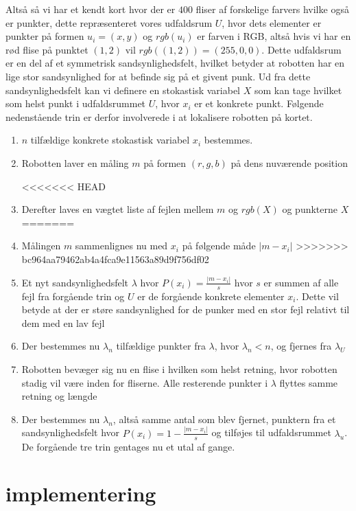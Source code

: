 \documentclass[../../SRP.tex]{subfiles}
\begin{document}

\begin{center}
\end{center}

Altså så vi har et kendt kort hvor der er $400$ fliser af forskelige farvers hvilke også er punkter, dette repræsenteret vores udfaldsrum $U$, hvor dets elementer er punkter på formen $u_i = (x,y)$ og $rgb(u_i)$ er farven i RGB, altså hvis vi har en rød flise på punktet $(1,2)$ vil $rgb((1,2)) = (255,0,0)$. Dette udfaldsrum er en del af et symmetrisk sandsynlighedsfelt, hvilket betyder at robotten har en lige stor sandsynlighed for at befinde sig på et givent punk. Ud fra dette sandsynlighedsfelt kan vi definere en stokastisk variabel $X$ som kan tage hvilket som helst punkt i udfaldsrummet $U$, hvor $x_i$ er et konkrete punkt. Følgende nedenstående trin er derfor involverede i at lokalisere robotten på kortet.

\begin{enumerate}
  \item $n$ tilfældige konkrete stokastisk variabel $x_i$ bestemmes.

  \item Robotten laver en måling $m$ på formen $(r,g,b)$ på dens nuværende position

<<<<<<< HEAD
  \item Derefter laves en vægtet liste af fejlen mellem $m$ og $rgb(X)$ og punkterne $X$
=======
  \item Målingen $m$ sammenlignes nu med $x_i$ på følgende måde $|m - x_i|$
>>>>>>> bc964aa79462ab4a4fca9e11563a89d9f756df02

  \item Et nyt sandsynlighedsfelt $\lambda$ hvor $P(x_i) = \frac{|m - x_i|}{s}$ hvor $s$ er summen af alle fejl fra forgående trin og $U$ er de forgående konkrete elementer $x_i$. Dette vil betyde at der er støre sandsynlighed for de punker med en stor fejl relativt til dem med en lav fejl

  \item Der bestemmes nu $\lambda_n$ tilfældige punkter fra $\lambda$, hvor $ \lambda_n < n$, og fjernes fra $\lambda_U$

  \item Robotten bevæger sig nu en flise i hvilken som helst retning, hvor robotten stadig vil være inden for fliserne. Alle resterende punkter i $\lambda$ flyttes samme retning og længde 

  \item Der bestemmes nu $\lambda_n$, altså samme antal som blev fjernet, punktern fra et sandsynlighedsfelt hvor $P(x_i) = 1-\frac{|m-x_i|}{s}$ og tilføjes til udfaldsrummet $\lambda_u$. De forgående tre trin gentages nu et utal af gange.
\end{enumerate}

\section{implementering}
\end{document}
